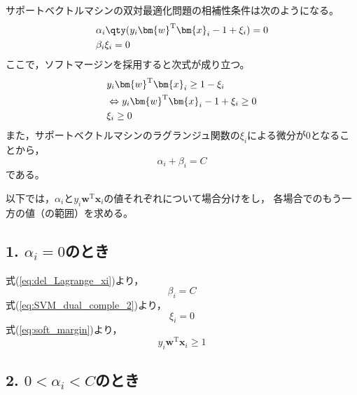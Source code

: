 \documentclass[class=jsarticle, crop=false, dvipdfmx, fleqn]{standalone}
\begin{document}
\section{}

サポートベクトルマシンの双対最適化問題の相補性条件は次のようになる。
\begin{align}
    & \alpha_i \qty(y_i \bm{w}^\mathrm{T} \bm{x}_i - 1 + \xi_i) = 0
        \label{eq:SVM_dual_comple_1} \\
    & \beta_i \xi_i = 0
    \label{eq:SVM_dual_comple_2}
\end{align}
ここで，ソフトマージンを採用すると次式が成り立つ。
\begin{align}
    & y_i \bm{w}^\mathrm{T}\bm{x}_i \ge 1 - \xi_i \notag \\
    & \Leftrightarrow y_i \bm{w}^\mathrm{T}\bm{x}_i - 1 + \xi_i \ge 0
        \label{eq:soft_margin} \\
    & \xi_i \ge 0
        \label{eq:margin}
\end{align}
また，サポートベクトルマシンのラグランジュ関数の\(\xi_i\)による微分が\(0\)となることから，
\begin{equation}
    \alpha_i + \beta_i = C
        \label{eq:del_Lagrange_xi}
\end{equation}
である。

以下では，\(\alpha_i\)と\(y_i \bm{w}^\mathrm{T}\bm{x}_i\)の値それぞれについて場合分けをし，
各場合でのもう一方の値（の範囲）を求める。



\subsection*{1. \(\alpha_i = 0\)のとき}

式(\ref{eq:del_Lagrange_xi})より，
\begin{equation*}
    \beta_i = C
\end{equation*}
式(\ref{eq:SVM_dual_comple_2})より，
\begin{equation*}
    \xi_i = 0
\end{equation*}
式(\ref{eq:soft_margin})より，
\begin{equation}
    y_i \bm{w}^\mathrm{T}\bm{x}_i \ge 1
\end{equation}



\subsection*{2. \(0 < \alpha_i < C\)のとき}
\end{document}
